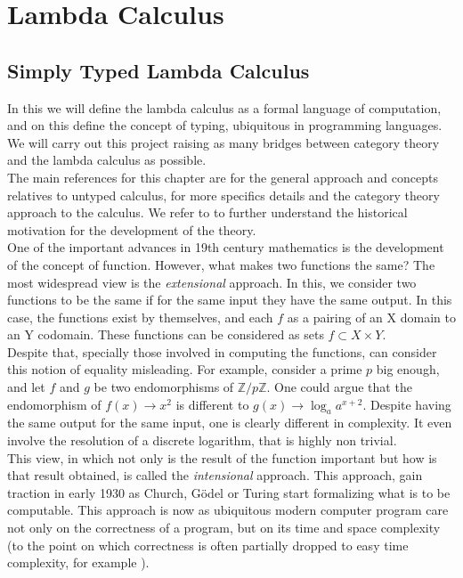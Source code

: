 
\part{Lambda Calculus}
\label{Part2}

\chapter{Simply Typed Lambda Calculus}

In this we will define the lambda calculus as a formal language of computation, and on this define the concept of typing, ubiquitous in programming languages. We will carry out this project raising as many bridges between category theory and the lambda calculus as possible.\\

The main references for this chapter are \cite{selinger2008lecture} for the general approach and concepts relatives to untyped calculus, \cite{lambek1988introduction} for more specifics details and the category theory approach to the calculus. We refer to \cite{cardone2006history} to further understand the historical motivation for the development of the theory.  \\


One of the important advances in 19th century mathematics is the development of the concept of function. However, what makes two functions the same? The most widespread view is the \emph{extensional} approach. In this, we consider two functions to be the same if for the same input they have the same output. In this case, the functions exist by themselves, and each $f$ as a pairing of an X domain to an Y codomain. These functions can  be considered as sets $f\subset X \times Y$.\\

Despite that, specially those involved in computing the functions, can consider this notion of equality misleading. For example, consider a prime $p$ big enough, and let $f$ and $g$ be two endomorphisms of  $\mathbb{Z}/p\mathbb{Z}$. One could argue that the endomorphism of  $f(x)\to x^2$ is different to $g(x) \to \log_a a^{x+2}$. Despite having the same output for the same input, one is clearly different in complexity. It even involve the resolution of a discrete logarithm, that is highly non trivial. \\

This view, in which not only is the result of the function important but how is that result obtained, is called the \emph{intensional} approach. This approach, gain traction in early 1930 as Church\cite{church1932set}, Gödel\cite{adams2011early} or Turing\cite{turing1938computable} start formalizing what is to be computable. This approach is now as ubiquitous modern computer program care not only on the correctness of a program, but on its time and space complexity (to the point on which correctness is often partially dropped to easy time complexity, for example \cite{hofmeister2002probabilistic}). \\

